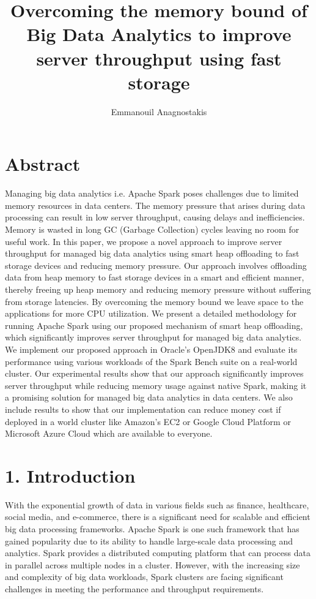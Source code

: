 \documentclass[twocolumn,10pt]{asme2e}
\title{Overcoming the memory bound of Big Data Analytics to improve server throughput using fast storage}
\author{Emmanouil Anagnostakis
    \affiliation{
	    Graduate Research Assistant\\
	    Computer Architecture and VLSI Systems Laboratory, ICS-FORTH\\
	    Heraklion, Greece\\
      manosanag@ics.forth.gr
    }	
}
\begin{document}
\maketitle    

\section*{Abstract}

Managing big data analytics i.e. Apache Spark poses challenges due to limited memory resources in data centers. The memory pressure that arises during data processing can result in low server throughput, causing delays and inefficiencies. Memory is wasted in long GC (Garbage Collection) cycles leaving no room for useful work. In this paper, we propose a novel approach to improve server throughput for managed big data analytics using smart heap offloading to fast storage devices and reducing memory pressure. Our approach involves offloading data from heap memory to fast storage devices in a smart and efficient manner, thereby freeing up heap memory and reducing memory pressure without suffering from storage latencies. By overcoming the memory bound we leave space to the applications for more CPU utilization. We present a detailed methodology for running Apache Spark using our proposed mechanism of smart heap offloading, which significantly improves server throughput for managed big data analytics. We implement our proposed approach in Oracle's OpenJDK8 and evaluate its performance using various workloads of the Spark Bench suite on a real-world cluster. Our experimental results show that our approach significantly improves server throughput while reducing memory usage against native Spark, making it a promising solution for managed big data analytics in data centers. We also include results to show that our implementation can reduce money cost if deployed in a world cluster like Amazon's EC2 or Google Cloud Platform or Microsoft Azure Cloud which are available to everyone. 

\section*{1. Introduction}

With the exponential growth of data in various fields such as finance, healthcare, social media, and e-commerce, there is a significant need for scalable and efficient big data processing frameworks. Apache Spark \cite{Spark} is one such framework that has gained popularity due to its ability to handle large-scale data processing and analytics. Spark provides a distributed computing platform that can process data in parallel across multiple nodes in a cluster. However, with the increasing size and complexity of big data workloads, Spark clusters are facing significant challenges in meeting the performance and throughput requirements.
\end{document}

